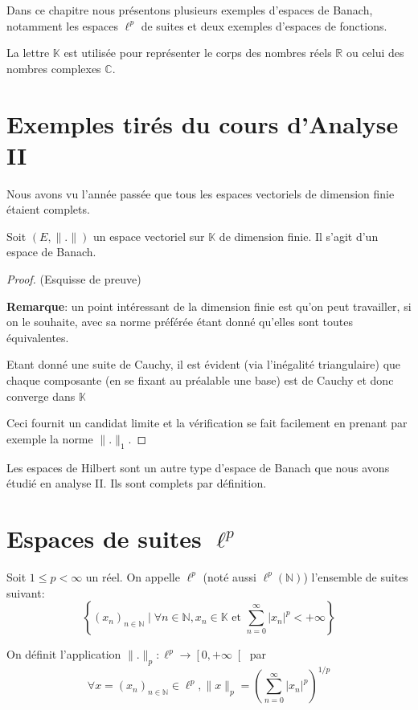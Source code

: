 Dans ce chapitre nous présentons plusieurs exemples d'espaces de Banach,
notamment les espaces $\ell^p$ de suites et deux exemples d'espaces de fonctions.

La lettre $\mathbb{K}$ est utilisée pour représenter le
corps des nombres réels $\mathbb{R}$ ou celui des nombres
complexes $\mathbb{C}$.
\section{Exemples tirés du cours d'Analyse II}

Nous avons vu l'année passée que tous les espaces vectoriels
de dimension finie étaient complets.
\begin{prop}
  Soit $(E, \|.\|)$ un espace vectoriel sur $\mathbb{K}$
  de dimension finie. Il s'agit d'un espace de Banach.
\end{prop}
\begin{proof}(Esquisse de preuve)

  \textbf{Remarque}: un point intéressant de la dimension finie est qu'on
  peut travailler, si on le souhaite, avec sa norme
  préférée étant donné qu'elles sont toutes équivalentes.

  Etant donné une suite de Cauchy, il est évident (via l'inégalité
  triangulaire) que chaque composante (en se fixant au préalable
  une base) est de Cauchy et donc converge dans $\mathbb{K}$

  Ceci fournit un candidat limite et la vérification se fait
  facilement en prenant par exemple la norme $\|.\|_1$.
\end{proof}

Les espaces de Hilbert sont un autre type d'espace de Banach
que nous avons étudié en analyse II. Ils sont complets par
définition.

\section{Espaces de suites $\ell^p$}
\begin{df}
  Soit $1\leq p<\infty$ un réel. On appelle $\ell^p$ (noté aussi
  $\ell^p(\mathbb{N})$) l'ensemble  de suites suivant:
  \begin{equation*}
    \left\{(x_n)_{n\in\mathbb{N}}\mid
       \forall  n\in\mathbb{N}, x_n\in\mathbb{K} \mbox{ et }
      \sum_{n=0}^\infty|x_n|^p<+\infty\right\}
  \end{equation*}

  On définit l'application $\|.\|_p:\ell^p\to\left[0, +\infty\right[$
  par
  $$ \forall  x=(x_n)_{n\in\mathbb{N}}\in \ell^p, \|x\|_p=
  \left(\sum_{n=0}^\infty|x_n|^p\right)^{1/p}$$
\end{df}

